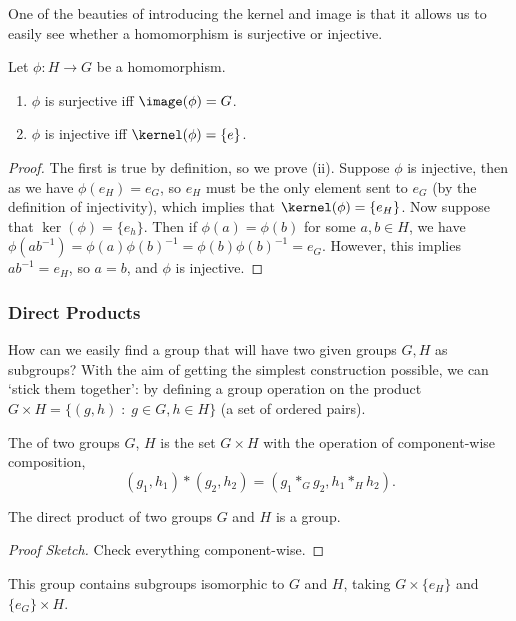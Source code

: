 \documentclass[a4paper]{scrartcl}
\newcommand{\newsubsection}{\subsubsection}
\begin{document}
One of the beauties of introducing the kernel and image is that it allows us to easily see whether a homomorphism is surjective or injective.

\begin{proposition}
	Let $\phi : H \rightarrow G$ be a homomorphism.
	\begin{enumerate}[label=(\roman*)]
		\item $\phi$ is surjective iff $\image(\phi) = G$.
		\item $\phi$ is injective iff $\kernel(\phi) = \{e\}$.
	\end{enumerate}	
\end{proposition}
\begin{proof}
	The first is true by definition, so we prove (ii). Suppose $\phi$ is injective, then as we have $\phi(e_H) = e_G$, so $e_H$ must be the only element sent to $e_G$ (by the definition of injectivity), which implies that $\kernel(\phi) = \{ e_H \}$.
	Now suppose that $\ker(\phi) = \{ e_h \}$. Then if $\phi(a) = \phi(b)$ for some $a, b \in H$, we  have $\phi(ab^{-1}) = \phi(a)\phi(b)^{-1} = \phi(b)\phi(b)^{-1} = e_G$. However, this implies $ab^{-1} = e_H$, so $a = b$, and $\phi$ is injective.
\end{proof}



\newsubsection{Direct Products}

How can we easily find a group that will have two given groups $G, H$ as subgroups?
With the aim of getting the simplest construction possible, we can `stick them together': by defining a group operation on the product $G \times H = \{ (g, h)  \; : \; g \in G, h \in H\}$ (a set of ordered pairs).

\begin{definition}
	The  of two groups $G$, $H$ is the set $G \times H$ with the operation of component-wise composition,
	$$
	(g_1, h_1) * (g_2, h_2) = (g_1 *_G g_2, h_1 *_H h_2).
	$$
\end{definition}

\begin{proposition}
	The direct product of two groups $G$ and $H$ is a group.
\end{proposition}
\begin{proof}[Proof Sketch]
	Check everything component-wise.
\end{proof}

This group contains subgroups isomorphic to $G$ and $H$, taking $G \times \{ e_H \}$ and $\{ e_G \} \times H$.
\end{document}
